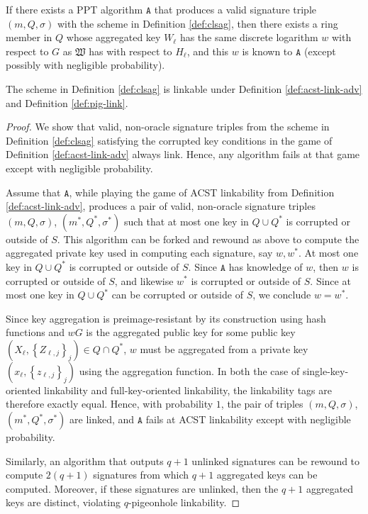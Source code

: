 \documentclass{llncs}
\newcommand{\A}{\texttt{A}}
\begin{document}
\begin{corollary}\label{cor:no-aliens}
If there exists a PPT algorithm $\A$  that produces a valid signature triple $(m, Q, \sigma)$ with the scheme in Definition \ref{def:clsag}, then there exists a ring member in $Q$ whose aggregated key $W_\ell$ has the same discrete logarithm $w$ with respect to $G$ as $\mathfrak{W}$ has with respect to $H_\ell$, and this $w$ is known to $\A$ (except possibly with negligible probability).
\end{corollary}

\begin{theorem}\label{thm:linkabilty}
The scheme in Definition \ref{def:clsag} is linkable under Definition \ref{def:acst-link-adv} and Definition \ref{def:pig-link}.
\end{theorem}

\begin{proof}
We show that valid, non-oracle signature triples from the scheme in Definition \ref{def:clsag} satisfying the corrupted key conditions in the game of Definition \ref{def:acst-link-adv} always link. Hence, any algorithm fails at that game except with negligible probability.

Assume that $\A$,  while playing the game of ACST linkability from Definition \ref{def:acst-link-adv}, produces a pair of valid, non-oracle signature triples $(m, Q, \sigma)$, $(m^*, Q^*, \sigma^*)$ such that at most one key in $Q \cup Q^*$ is corrupted or outside of $S$. This algorithm can be forked and rewound as above to compute the aggregated private key used in computing each signature, say $w, w^*$. At most one key in $Q \cup Q^*$ is corrupted or outside of $S$. Since $\A$ has knowledge of $w$, then $w$ is corrupted or outside of $S$, and likewise $w^*$ is corrupted or outside of $S$. Since at most one key in $Q \cup Q^*$ can be corrupted or outside of $S$, we conclude $w = w^*$.

Since key aggregation is preimage-resistant by its construction using hash functions and $wG$ is the aggregated public key for some public key $(X_\ell, \left\{Z_{\ell, j}\right\}_j) \in Q \cap Q^*$, $w$ must be aggregated from a private key $(x_\ell, \left\{z_{\ell, j}\right\}_j)$ using the aggregation function. In both the case of single-key-oriented linkability and full-key-oriented linkability, the linkability tags are therefore exactly equal. Hence, with probability $1$, the pair of triples $(m, Q, \sigma)$, $(m^*, Q^*, \sigma^*)$ are linked, and $\A$ fails at ACST linkability except with negligible probability.

Similarly, an algorithm that outputs $q+1$ unlinked signatures can be rewound to compute $2(q+1)$ signatures from which $q+1$ aggregated keys can be computed. Moreover, if these signatures are unlinked, then the $q+1$ aggregated keys are distinct, violating $q$-pigeonhole linkability.
\end{proof}
\end{document}

